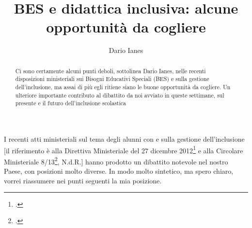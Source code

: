 \author{Dario Ianes}
\title{BES e didattica inclusiva: alcune opportunità da cogliere}
\label{cha:ianes1}
\begin{abstract}
Ci sono certamente alcuni punti deboli, sottolinea Dario Ianes, nelle recenti disposizioni ministeriali sui Bisogni Educativi Speciali (BES) e sulla gestione dell'inclusione, ma assai di più egli ritiene siano le buone opportunità da cogliere. Un ulteriore importante contributo al dibattito da noi avviato in queste settimane, sul presente e il futuro dell'inclusione scolastica
\end{abstract}
\maketitle
{}
I recenti atti ministeriali sul tema degli alunni con   e sulla gestione dell'inclusione [il riferimento è alla Direttiva Ministeriale del 27 dicembre 2012\footcite{dir27Dic2012} e alla Circolare Ministeriale 8/13\footcite{cm8_2013}, N.d.R.] hanno prodotto un dibattito notevole nel nostro Paese, con posizioni molto diverse. In modo molto sintetico, ma spero chiaro, vorrei riassumere nei punti seguenti la mia posizione.

